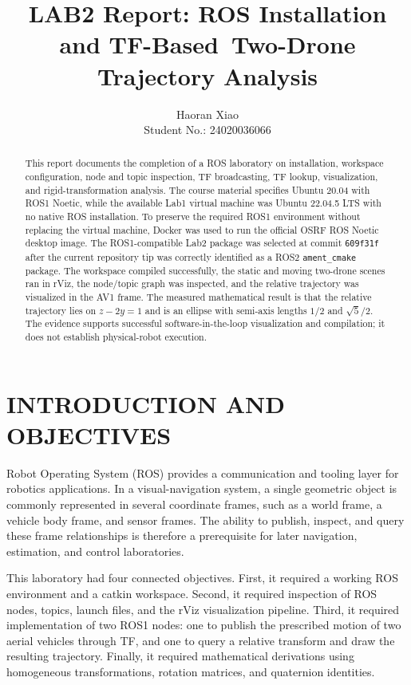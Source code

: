 \documentclass[letterpaper, 10 pt, conference]{ieeeconf}
\title{\LARGE \bf
LAB2 Report: ROS Installation and TF-Based\ Two-Drone Trajectory Analysis
}
\author{Haoran Xiao\\Student No.: 24020036066}
\begin{document}
\maketitle
\thispagestyle{empty}
\pagestyle{empty}

\begin{abstract}
This report documents the completion of a ROS laboratory on installation, workspace configuration, node and topic inspection, TF broadcasting, TF lookup, visualization, and rigid-transformation analysis. The course material specifies Ubuntu 20.04 with ROS1 Noetic, while the available Lab1 virtual machine was Ubuntu 22.04.5 LTS with no native ROS installation. To preserve the required ROS1 environment without replacing the virtual machine, Docker was used to run the official OSRF ROS Noetic desktop image. The ROS1-compatible Lab2 package was selected at commit \texttt{609f31f} after the current repository tip was correctly identified as a ROS2 \texttt{ament\_cmake} package. The workspace compiled successfully, the static and moving two-drone scenes ran in rViz, the node/topic graph was inspected, and the relative trajectory was visualized in the AV1 frame. The measured mathematical result is that the relative trajectory lies on \(z-2y=1\) and is an ellipse with semi-axis lengths \(1/2\) and \(\sqrt{5}/2\). The evidence supports successful software-in-the-loop visualization and compilation; it does not establish physical-robot execution.
\end{abstract}

\section{INTRODUCTION AND OBJECTIVES}
\label{sec:introduction}
Robot Operating System (ROS) provides a communication and tooling layer for robotics applications. In a visual-navigation system, a single geometric object is commonly represented in several coordinate frames, such as a world frame, a vehicle body frame, and sensor frames. The ability to publish, inspect, and query these frame relationships is therefore a prerequisite for later navigation, estimation, and control laboratories.

This laboratory had four connected objectives. First, it required a working ROS environment and a catkin workspace. Second, it required inspection of ROS nodes, topics, launch files, and the rViz visualization pipeline. Third, it required implementation of two ROS1 nodes: one to publish the prescribed motion of two aerial vehicles through TF, and one to query a relative transform and draw the resulting trajectory. Finally, it required mathematical derivations using homogeneous transformations, rotation matrices, and quaternion identities.
\end{document}
